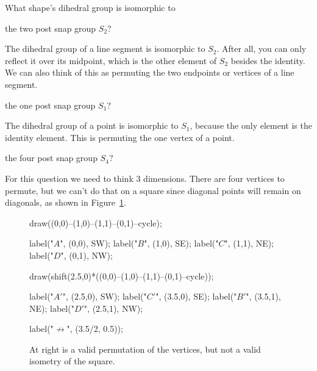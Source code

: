 \documentclass[../gatm_answers.tex]{subfiles}
\begin{document}
\begin{outer_problem}
\item What shape's dihedral group is isomorphic to
\end{outer_problem}

\begin{inner_problem}[start=1]
\item the two post snap group $S_2$?
\end{inner_problem}

\noindent The dihedral group of a line segment is isomorphic to $S_2$. After all, you can only reflect it over its midpoint, which is the other element of $S_2$ besides the identity. We can also think of this as permuting the two endpoints or vertices of a line segment.

\begin{inner_problem}
\item the one post snap group $S_1$?
\end{inner_problem}

\noindent The dihedral group of a point is isomorphic to $S_1$, because the only element is the identity element. This is permuting the one vertex of a point.

\begin{inner_problem}
\item the four post snap group $S_4$?
\end{inner_problem}

\noindent For this question we need to think $3$ dimensions. There are four vertices to permute, but we can't do that on a square since diagonal points will remain on diagonals, as shown in Figure~\ref{fig:impossiblus_square}.

\begin{figure}[h]
	\begin{center}
		\begin{minipage}[b]{\textwidth}
			\centering
			\begin{asy}[width=0.5\textwidth]
			draw((0,0)--(1,0)--(1,1)--(0,1)--cycle);
			
			label("$A$", (0,0), SW);
			label("$B$", (1,0), SE);
			label("$C$", (1,1), NE);
			label("$D$", (0,1), NW);
			
			draw(shift(2.5,0)*((0,0)--(1,0)--(1,1)--(0,1)--cycle));
			
			label("$A'$", (2.5,0), SW);
			label("$C'$", (3.5,0), SE);
			label("$B'$", (3.5,1), NE);
			label("$D'$", (2.5,1), NW);
			
			label("$\not\longrightarrow$", (3.5/2, 0.5));
			\end{asy}
		\end{minipage}
	\end{center}
	\vspace*{-2\baselineskip}
	\begin{center}
		\begin{minipage}[t]{\textwidth}
			\caption{At right is a valid permutation of the vertices, but not a valid isometry of the square.}
			\label{fig:impossiblus_square}
		\end{minipage}
	\end{center}
	\vspace*{-2\baselineskip}
\end{figure}
\end{document}
